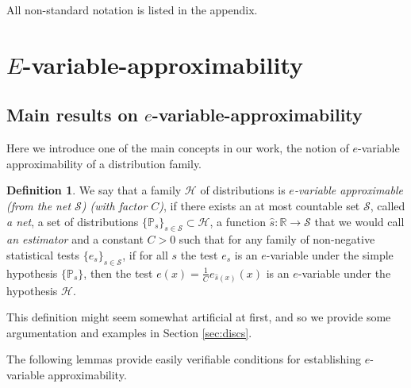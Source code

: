 \documentclass{article}
\theoremstyle{definition}
\theoremstyle{definition}
\newtheorem{definition}{Definition}[section]
\newcommand{\reals}{\mathbb{R}}
\newcommand{\probP}{\mathbb{P}}
\begin{document}
All non-standard notation is listed in the appendix.

\section{$E$-variable-approximability}\label{sec:e-var-approx}


\subsection{Main results on $e$-variable-approximability}


Here we introduce one of the main concepts in our work, the notion of $e$-variable approximability of a distribution family. 

\begin{definition}\label{dfn:e-val-approx}
    We say that a family $\mathcal{H}$ of distributions is \emph{$e$-variable approximable (from the net $\mathcal{S}$) (with factor $C$)}, if there exists an at most countable set $\mathcal{S}$, called \emph{a net}, a set of distributions $\{\probP_s\}_{s\in \mathcal{S}} \subset \mathcal{H}$, a function $\hat s : \reals \to \mathcal{S}$ that we would call \emph{an estimator} and a constant $C > 0$ such that for any family of non-negative statistical tests $\{e_s\}_{s\in\mathcal{S}}$, if for all $s$ the test $e_s$ is an $e$-variable under the simple hypothesis $\{ \probP_{s}\}$, then the test $e(x) = \frac{1}{C} e_{\hat s(x)}(x)$ is an $e$-variable under the hypothesis $\mathcal{H}$.
\end{definition}

This definition might seem somewhat artificial at first, and so we provide some argumentation and examples in Section \ref{sec:discs}.


The following lemmas provide easily verifiable conditions for establishing $e$-variable approximability. 
\end{document}
